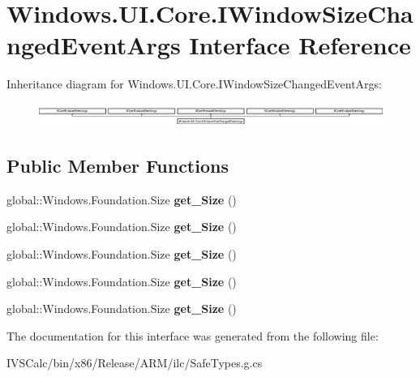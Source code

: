 \hypertarget{interface_windows_1_1_u_i_1_1_core_1_1_i_window_size_changed_event_args}{}\section{Windows.\+U\+I.\+Core.\+I\+Window\+Size\+Changed\+Event\+Args Interface Reference}
\label{interface_windows_1_1_u_i_1_1_core_1_1_i_window_size_changed_event_args}
Inheritance diagram for Windows.\+U\+I.\+Core.\+I\+Window\+Size\+Changed\+Event\+Args\+:\begin{figure}[H]
\begin{center}
\leavevmode
\includegraphics[height=0.741722cm]{interface_windows_1_1_u_i_1_1_core_1_1_i_window_size_changed_event_args}
\end{center}
\end{figure}
\subsection*{Public Member Functions}
\begin{DoxyCompactItemize}
\item 
\mbox{\label{interface_windows_1_1_u_i_1_1_core_1_1_i_window_size_changed_event_args_a3815577c1cd2f0fe86da214bf3ccafda}} 
global\+::\+Windows.\+Foundation.\+Size {\bfseries get\+\_\+\+Size} ()
\item 
\mbox{\label{interface_windows_1_1_u_i_1_1_core_1_1_i_window_size_changed_event_args_a3815577c1cd2f0fe86da214bf3ccafda}} 
global\+::\+Windows.\+Foundation.\+Size {\bfseries get\+\_\+\+Size} ()
\item 
\mbox{\label{interface_windows_1_1_u_i_1_1_core_1_1_i_window_size_changed_event_args_a3815577c1cd2f0fe86da214bf3ccafda}} 
global\+::\+Windows.\+Foundation.\+Size {\bfseries get\+\_\+\+Size} ()
\item 
\mbox{\label{interface_windows_1_1_u_i_1_1_core_1_1_i_window_size_changed_event_args_a3815577c1cd2f0fe86da214bf3ccafda}} 
global\+::\+Windows.\+Foundation.\+Size {\bfseries get\+\_\+\+Size} ()
\item 
\mbox{\label{interface_windows_1_1_u_i_1_1_core_1_1_i_window_size_changed_event_args_a3815577c1cd2f0fe86da214bf3ccafda}} 
global\+::\+Windows.\+Foundation.\+Size {\bfseries get\+\_\+\+Size} ()
\end{DoxyCompactItemize}


The documentation for this interface was generated from the following file\+:\begin{DoxyCompactItemize}
\item 
I\+V\+S\+Calc/bin/x86/\+Release/\+A\+R\+M/ilc/Safe\+Types.\+g.\+cs\end{DoxyCompactItemize}

